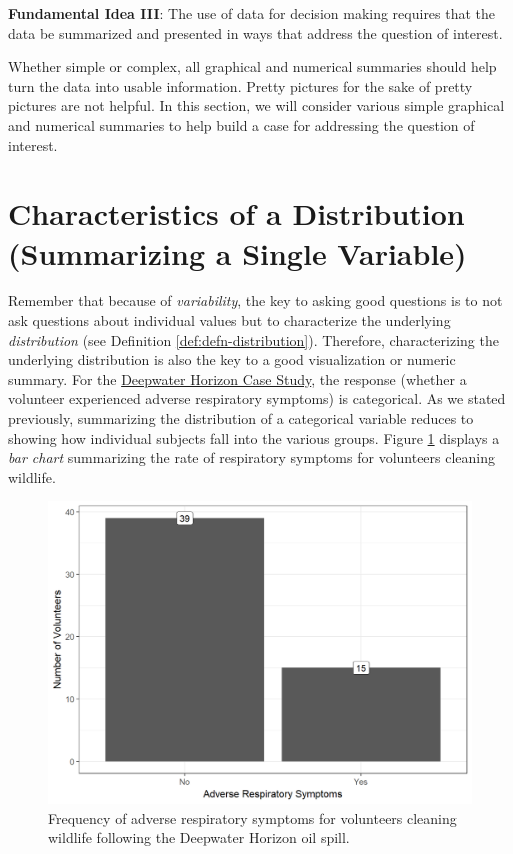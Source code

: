 \documentclass[]{book}
\theoremstyle{definition}
\theoremstyle{definition}
\theoremstyle{definition}
\theoremstyle{remark}
\let\BeginKnitrBlock\begin \let\EndKnitrBlock\end
\begin{document}
\BeginKnitrBlock{rmdfivefund}
\textbf{Fundamental Idea III}: The use of data for decision making
requires that the data be summarized and presented in ways that address
the question of interest.
\EndKnitrBlock{rmdfivefund}

Whether simple or complex, all graphical and numerical summaries should
help turn the data into usable information. Pretty pictures for the sake
of pretty pictures are not helpful. In this section, we will consider
various simple graphical and numerical summaries to help build a case
for addressing the question of interest.

\section{Characteristics of a Distribution (Summarizing a Single
Variable)}\label{characteristics-of-a-distribution-summarizing-a-single-variable}

Remember that because of \emph{variability}, the key to asking good
questions is to not ask questions about individual values but to
characterize the underlying \emph{distribution} (see Definition
\ref{def:defn-distribution}). Therefore, characterizing the underlying
distribution is also the key to a good visualization or numeric summary.
For the \protect\hyperlink{CaseDeepwater}{Deepwater Horizon Case Study},
the response (whether a volunteer experienced adverse respiratory
symptoms) is categorical. As we stated previously, summarizing the
distribution of a categorical variable reduces to showing how individual
subjects fall into the various groups. Figure
\ref{fig:summaries-deepwater-barchart} displays a \emph{bar chart}
summarizing the rate of respiratory symptoms for volunteers cleaning
wildlife.

\begin{figure}

{\centering \includegraphics[width=0.8\linewidth]{./Images/summaries-deepwater-barchart-1} 

}

\caption{Frequency of adverse respiratory symptoms for volunteers cleaning wildlife following the Deepwater Horizon oil spill.}\label{fig:summaries-deepwater-barchart}
\end{figure}
\end{document}
